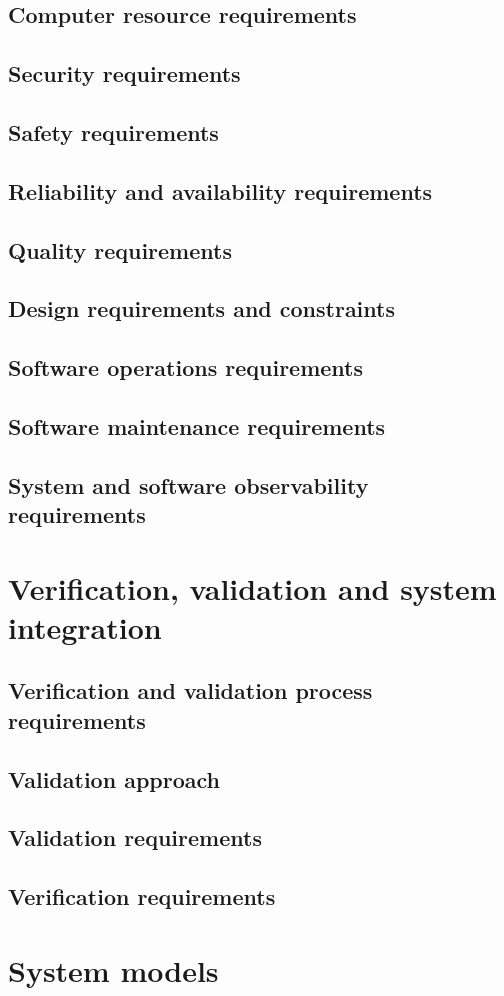 \subsection{Computer resource requirements}
\subsection{Security requirements }
\subsection{Safety requirements}
\subsection{Reliability and availability requirements}
\subsection{Quality requirements}
\subsection{Design requirements and constraints}
\subsection{Software operations requirements}
\subsection{Software maintenance requirements}
\subsection{System and software observability requirements}
\section{Verification, validation and system integration}
 \subsection{Verification and validation process requirements}
 \subsection{Validation approach}
 \subsection{Validation requirements}
 \subsection{Verification requirements}
 \section{System models}

